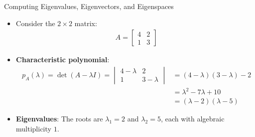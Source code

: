 \begin{frame}{Computing Eigenvalues, Eigenvectors, and Eigenspaces}
\begin{itemize}
\item Consider the $2\times 2$ matrix:
\begin{align}
    A = \begin{bmatrix} 4 & 2\\ 1 & 3 \end{bmatrix}
\end{align}
\item \textbf{Characteristic polynomial}:
\begin{align}
    p_A(\lambda) = \det(A-\lambda I) = \begin{vmatrix} 4-\lambda & 2\\ 1 & 3-\lambda \end{vmatrix} &= (4-\lambda)(3-\lambda) - 2 \\
    &= \lambda^2 - 7\lambda + 10 \\
    &= (\lambda-2)(\lambda-5)
\end{align}
\item \textbf{Eigenvalues}: The roots are $\lambda_1 = 2$ and $\lambda_2 = 5$, each with algebraic multiplicity $1$.
\end{itemize}
\end{frame}


